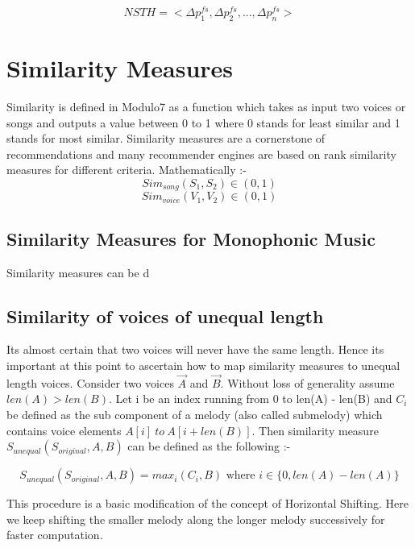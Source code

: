 \begin{equation}
NSTH = <\Delta p^{fs}_1, \Delta p^{fs}_2, ... , \Delta p^{fs}_n>
\end{equation}

\section{Similarity Measures}

\noindent Similarity is defined in Modulo7 as a function which takes as input two voices or songs and outputs a value between 0 to 1 where 0 stands for least similar and 1 stands for most similar. Similarity measures are a cornerstone of recommendations and many recommender engines are based on rank similarity measures for different criteria. Mathematically :-
\begin{equation}
Sim_{song}(S_1, S_2) \in (0, 1)
\end{equation}
\begin{equation}
Sim_{voice}(V_1, V_2) \in (0, 1)
\end{equation}

\subsection{Similarity Measures for Monophonic Music}

Similarity measures can be d

\subsection{Similarity of voices of unequal length} 

\noindent Its almost certain that two voices will  never have the same length. Hence its important at this point to ascertain how to map similarity measures to unequal length voices. Consider two voices $\vec{A}$ and $\vec{B}$. Without loss of generality assume $len(A) > len(B)$. Let i be an index running from 0 to len(A) - len(B) and $C_i$ be defined as the sub component of a melody (also called submelody) which contains voice elements $A[i] \ to \ A[i + len(B)]$. Then similarity measure $S_{unequal}(S_{original}, A, B)$ can be defined as the following :-

\begin{equation}
S_{unequal}(S_{original}, A, B) = max_i (C_i, B) \text{ where } i \in \{0, len(A) - len(A)\}
\end{equation}

\noindent This procedure is a basic modification of the concept of Horizontal Shifting\cite{similietechnicalmanual}. Here we keep shifting the smaller melody along the longer melody successively for faster computation.